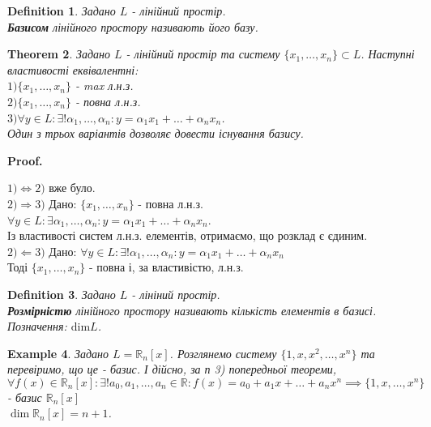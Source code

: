 \documentclass[a4paper, 10pt]{article}
\makeatletter
\def\qed{$\blacksquare$}
\theoremstyle{theoremdd}
\newtheorem{theorem}{Theorem}[subsection]
\theoremstyle{theoremdd}
\newtheorem{definition}[theorem]{Definition}
\theoremstyle{theoremdd}
\theoremstyle{theoremdd}
\newtheorem{example}[theorem]{Example}
\theoremstyle{theoremdd}
\theoremstyle{theoremdd}
\theoremstyle{theoremdd}
\theoremstyle{theoremdd}
\renewenvironment{proof}[1][Proof.\\]{\par
\pushQED{\hfill \qed}%
\normalfont \topsep6\p@\@plus6\p@\relax
\trivlist
\item\relax
{\bfseries
#1\@addpunct{.}}\hspace\labelsep\ignorespaces
}{%
\popQED\endtrivlist\@endpefalse
}
\makeatother
\begin{document}
	\begin{definition}
	Задано $L$ - лінійний простір.\\
	\textbf{Базисом} лінійного простору називають його базу.
	\end{definition}
	
	\begin{theorem}
	Задано $L$ - лінійний простір та систему $\{x_1, \dots, x_n\} \subset L$. Наступні властивості еквівалентні:\\
	$1) \{x_1, \dots, x_n\}$ - max л.н.з.\\
	$2) \{x_1, \dots, x_n\}$ - повна л.н.з.\\
	$3) \forall y \in L: \exists! \alpha_1, \dots, \alpha_n: y = \alpha_1 x_1 + \dots + \alpha_n x_n$.\\
	\textit{Один з трьох варіантів дозволяє довести існування базису.}
	\end{theorem}
	
	\begin{proof}
	$\boxed{1) \Leftrightarrow 2)}$ вже було.
	\bigskip \\
	$\boxed{2) \Rightarrow 3)}$ Дано: $\{x_1, \dots, x_n\}$ - повна л.н.з.\\
	$\forall y \in L: \exists \alpha_1, \dots, \alpha_n: y = \alpha_1 x_1 + \dots + \alpha_n x_n$.\\
	Із властивості систем л.н.з. елементів, отримаємо, що розклад є єдиним.
	\bigskip \\
	$\boxed{2) \Leftarrow 3)}$ Дано: $\forall y \in L: \exists! \alpha_1, \dots, \alpha_n: y = \alpha_1 x_1 + \dots + \alpha_n x_n$\\
	Тоді $\{x_1, \dots, x_n\}$ - повна і, за властивістю, л.н.з.
	\end{proof}
	
	\begin{definition}
	Задано $L$ - лініний простір.\\
	\textbf{Розмірністю} лінійного простору називають кількість елементів в базисі.\\
	Позначення: $\textrm{dim} L$.
	\end{definition}
	
	\begin{example}
	Задано $L = \mathbb{R}_n[x]$. Розглянемо систему $\{1, x, x^2, \dots, x^n\}$ та перевіримо, що це - базис. І дійсно, за п 3) попередньої теореми,\\
	$\forall f(x) \in \mathbb{R}_n[x]: \exists! a_0, a_1, \dots, a_n \in \mathbb{R}: f(x) = a_0 + a_1 x + \dots + a_n x^n \implies \{1, x, \dots, x^n\}$ - базис $\mathbb{R}_n[x]$ \\ $\dim{\mathbb{R}_n[x]} = n+1$.
	\end{example}
	
\end{document}

